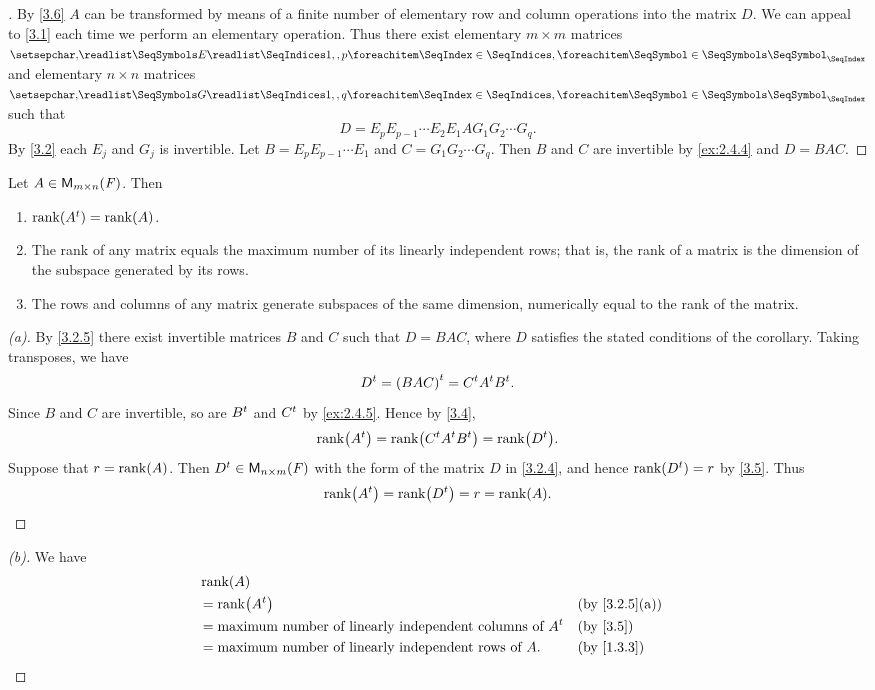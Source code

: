 \begin{proof}[]
	By \cref{3.6} \(A\) can be transformed by means of a finite number of elementary row and column operations into the matrix \(D\).
	We can appeal to \cref{3.1} each time we perform an elementary operation.
	Thus there exist elementary \(m \times m\) matrices \(\seq{E}{1,,p}\) and elementary \(n \times n\) matrices \(\seq{G}{1,,q}\) such that
	\[
		D = E_p E_{p - 1} \cdots E_2 E_1 A G_1 G_2 \cdots G_q.
	\]
	By \cref{3.2} each \(E_j\) and \(G_j\) is invertible.
	Let \(B = E_p E_{p - 1} \cdots E_1\) and \(C = G_1 G_2 \cdots G_q\).
	Then \(B\) and \(C\) are invertible by \cref{ex:2.4.4} and \(D = BAC\).
\end{proof}

\begin{cor}\label{3.2.5}
	Let \(A \in \mathsf{M}_{{m} \times n}({\mathit{F}})\).
	Then
	\begin{enumerate}
		\item \(\rk{\tp{A}} = \rk{A}\).
		\item The rank of any matrix equals the maximum number of its linearly independent rows;
		      that is, the rank of a matrix is the dimension of the subspace generated by its rows.
		\item The rows and columns of any matrix generate subspaces of the same dimension, numerically equal to the rank of the matrix.
	\end{enumerate}
\end{cor}

\begin{proof}[(a)]
	By \cref{3.2.5} there exist invertible matrices \(B\) and \(C\) such that \(D = BAC\), where \(D\) satisfies the stated conditions of the corollary.
	Taking transposes, we have
	\[
		{D}^{t} = {\left\lparen BAC\right\rparen}^{t} = {C}^{t} {A}^{t} {B}^{t}.
	\]
	Since \(B\) and \(C\) are invertible, so are \({B}^{t}\) and \({C}^{t}\) by \cref{ex:2.4.5}.
	Hence by \cref{3.4},
	\[
		\rk{\tp{A}} = \rk{\tp{C} \tp{A} \tp{B}} = \rk{\tp{D}}.
	\]
	Suppose that \(r = \rk{A}\).
	Then \({D}^{t} \in \mathsf{M}_{{n} \times m}({\mathit{F}})\) with the form of the matrix \(D\) in \cref{3.2.4}, and hence \(\rk{\tp{D}} = r\) by \cref{3.5}.
	Thus
	\[
		\rk{\tp{A}} = \rk{\tp{D}} = r = \rk{A}.
	\]
\end{proof}

\begin{proof}[(b)]
	We have
	\begin{align*}
		 & \rk{A}                                                                                \\
		 & = \rk{\tp{A}}                                                      &  & \by{3.2.5}[a] \\
		 & = \text{maximum number of linearly independent columns of } \tp{A} &  & \by{3.5}      \\
		 & = \text{maximum number of linearly independent rows of } A.        &  & \by{1.3.3}
	\end{align*}
\end{proof}

